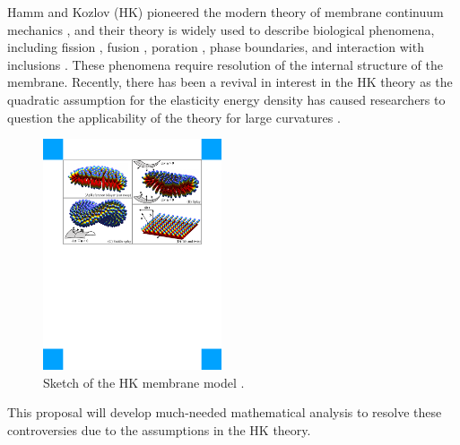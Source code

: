 Hamm and Kozlov (HK) pioneered 
the modern theory of membrane continuum mechanics \cite{Hamm2000}, and their theory
is widely used to describe biological phenomena, including 
fission \cite{FrEsAkSh15, Maetal15, PhysRevE.79.031926},
fusion \cite{ChKo08, KoKo2002,Kuzmin7235,Aeffner2012},
poration \cite{Gaetal20}, phase boundaries, and interaction with inclusions
\cite{SeLeMaEg17,Saetal20, Pietal20}. These phenomena
require resolution of the internal structure of the membrane.  
Recently, there has been a revival in interest in the HK theory as the quadratic assumption
for the elasticity energy density has caused
researchers to question the applicability of the theory 
for large curvatures
\cite{PhysRevLett.117.188102, ARGUDO20161619}.
%
\begin{figure}
\centerline{\includegraphics[width=0.47\textwidth]{Figures/Deformations.pdf}}
  \vspace{-5pt}
\caption{\label{fig:deformations} \footnotesize Sketch of the HK
 membrane model \cite{Hamm2000}.}
\end{figure}
%
This proposal will develop much-needed mathematical analysis to resolve
these controversies due to the assumptions in the HK theory. 



